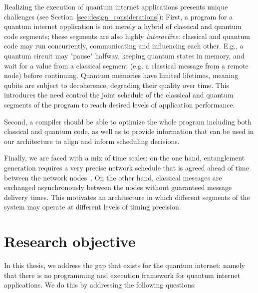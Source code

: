 
Realizing the execution of quantum internet applications presents unique challenges (see Section~\ref{sec:design_considerations}): 
First, a program for a quantum internet application is not merely a hybrid of classical and quantum code segments; these segments are also highly \textit{interactive}: classical and quantum code may run concurrently, communicating and influencing each other.
E.g., a quantum circuit may "pause" halfway, keeping quantum states in memory, and wait for a value from a classical segment (e.g. a classical message from a remote node) before continuing.
Quantum memories have limited lifetimes, meaning qubits are subject to decoherence, degrading their quality over time. This introduces the need 
control the joint schedule of the classical and quantum segments of the program to reach desired levels of application performance.

Second, a compiler should be able to optimize the whole program including both classical and quantum code, as well as to provide information that can be used in our architecture to align and inform scheduling decisions. 

Finally, we are faced with a mix of time scales:
on the one hand, entanglement generation requires a very precise network schedule that is agreed ahead of time between the network nodes~\cite{dahlberg2019link}. On the other hand, classical messages are exchanged asynchronously between the nodes without guaranteed message delivery times. This motivates an architecture in which different segments of the system may operate at different levels of timing precision. 

\section{Research objective}
In this thesis, we address the gap that exists for the quantum internet: namely that there is no programming and execution framework for quantum internet applications.
We do this by addressing the following questions:

